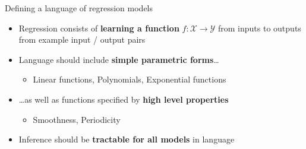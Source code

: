 \begin{frame}{Defining a language of regression models}
  \begin{itemize}
    \item Regression consists of {\bf learning a function} $f: \mathcal{X} \to \mathcal{Y}$ from inputs to outputs from example input / output pairs
    \vspace{\baselineskip}
    \item Language should include {\bf simple parametric forms}\ldots
    \begin{itemize}
       \item \eg Linear functions, Polynomials, Exponential functions
     \end{itemize}
    \vspace{\baselineskip}
    \item \ldots as well as functions specified by {\bf high level properties}
    \begin{itemize}
       \item \eg Smoothness, Periodicity
     \end{itemize}
    \vspace{\baselineskip}
    \item Inference should be {\bf tractable for all models} in language
  \end{itemize}
\end{frame}

